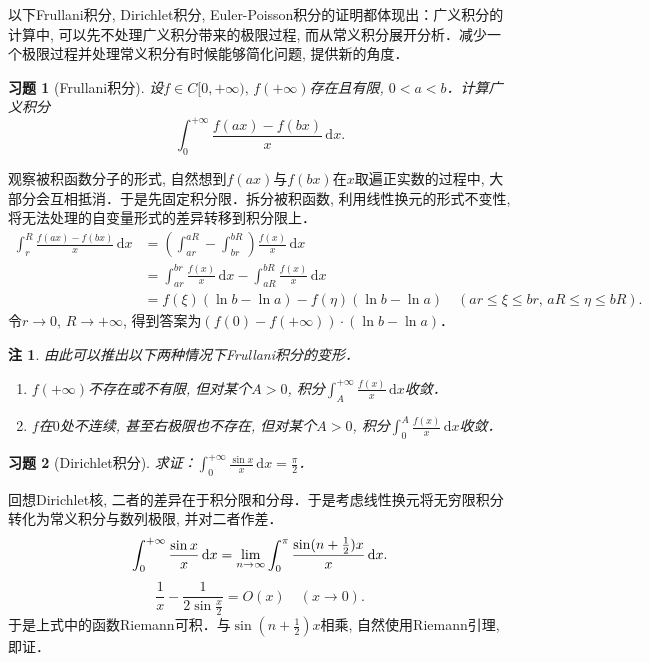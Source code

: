 \documentclass[11pt,a4paper]{ctexart}
\makeatletter
\theoremstyle{thmseries} %
\theoremstyle{exerseries}
\newtheorem{exer}{习题}[section]
\newtheorem*{rem}{注}
\renewenvironment{proof}[1][\proofname]{\par
  \pushQED{\qed}%
  \normalfont \topsep6\p@\@plus6\p@\relax
  \trivlist
  \item[\hskip\labelsep
        \itshape
    #1\@addpunct{}]\ignorespaces
}{%
  \popQED\endtrivlist\@endpefalse
}
\newenvironment{sol}{\begin{proof}[\bfseries\upshape 解\quad]}{\end{proof}}
\newenvironment{pf}{\begin{proof}[\bfseries\upshape 证\quad]}{\end{proof}}
\newcommand{\bra}[1]{\mathopen{}\left(#1\right)}
\renewcommand{\d}{\mathrm{d}}
\def \nti {\mathnormal{n}\to\infty}
\makeatother
\begin{document}
以下Frullani积分, Dirichlet积分, Euler-Poisson积分的证明都体现出：广义积分的计算中, 可以先不处理广义积分带来的极限过程, 而从常义积分展开分析．减少一个极限过程并处理常义积分有时候能够简化问题, 提供新的角度．
\begin{exer}[Frullani积分]
	设$f\in C[0,+\infty),\,f(+\infty)$存在且有限, $0<a<b$．计算广义积分
	\[\int_{0}^{+\infty}\frac{f(ax)-f(bx)}{x}\,\d x.\]
\end{exer}
\begin{sol}
	观察被积函数分子的形式, 自然想到$f(ax)$与$f(bx)$在$x$取遍正实数的过程中, 大部分会互相抵消．于是先固定积分限．拆分被积函数, 利用线性换元的形式不变性, 将无法处理的自变量形式的差异转移到积分限上．
	\begin{align*}
		\int_{r}^{R}\frac{f(ax)-f(bx)}{x}\,\d x&=\bra{\int_{ar}^{aR}-\int_{br}^{bR}}\frac{f(x)}{x}\,\d x\\
		&=\int_{ar}^{br}\frac{f(x)}{x}\,\d x-\int_{aR}^{bR}\frac{f(x)}{x}\,\d x\\
		&=f(\xi)(\ln b-\ln a)-f(\eta)(\ln b-\ln a)\quad (ar\leq\xi\leq br,\,aR\leq\eta\leq bR).
	\end{align*}
	令$r\to0,\,R\to+\infty$, 得到答案为$\bra{f(0)-f(+\infty)}\cdot(\ln b-\ln a)$．
\end{sol}
\begin{rem}
	由此可以推出以下两种情况下Frullani积分的变形．
	\begin{enumerate}
		\item $f(+\infty)$不存在或不有限, 但对某个$A>0$, 积分$\int_{A}^{+\infty}\frac{f(x)}{x}\,\d x$收敛．
		\item $f$在$0$处不连续, 甚至右极限也不存在, 但对某个$A>0$, 积分$\int_{0}^{A}\frac{f(x)}{x}\,\d x$收敛．
	\end{enumerate}
\end{rem}

\begin{exer}[Dirichlet积分]
	求证：$\int_{0}^{+\infty}\frac{\sin x}{x}\,\d x=\frac{\pi}{2}$．
\end{exer}
\begin{pf}
	回想Dirichlet核, 二者的差异在于积分限和分母．于是考虑线性换元将无穷限积分转化为常义积分与数列极限, 并对二者作差．
	\[\int_{0}^{+\infty}\frac{\sin x}{x}\,\d x=\lim_{\nti}\int_{0}^{\pi}\frac{\sin(n+\frac{1}{2})x}{x}\,\d x.\]
	\[\frac{1}{x}-\frac{1}{2\sin\frac{x}{2}}=O(x)\quad(x\to0).\]
	于是上式中的函数Riemann可积．与$\sin(n+\frac{1}{2})x$相乘, 自然使用Riemann引理, 即证．
\end{pf}
\end{document}
